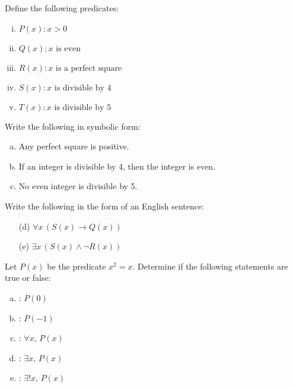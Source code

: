 \documentclass[11pt,letterpaper]{article}
\begin{document}
\newpage





 Define the following predicates:
	\begin{enumerate}[(i)]
	\item $P(x) \colon x > 0$
	\item $Q(x) \colon x \text{ is even}$
	\item $R(x) \colon x \text{ is a perfect square}$
	\item $S(x) \colon x \text{ is divisible by }4$
	\item $T(x) \colon x \text{ is divisible by }5$
	\end{enumerate}
Write the following in symbolic form:
	\begin{enumerate}[(a)]
	\item Any perfect square is positive. 
	\item If an integer is divisible by 4, then the integer is even. 
	\item No even integer is divisible by 5. 
	\end{enumerate}
Write the following in the form of an English sentence:
	\begin{enumerate}
	\item[(d)] $\forall x\, (S(x) \to Q(x))$
	\item[(e)] $\exists x\, (S(x) \wedge \neg R(x))$
	\end{enumerate}





\newpage





 Let $P(x)$ be the predicate $x^2= x$. Determine if the following statements are true or false:
	\begin{enumerate}[(a)]
	\item \uans{1.5cm}: $P(0)$
	\item \uans{1.5cm}: $P(-1)$
	\item \uans{1.5cm}: $\forall x,\, P(x)$
	\item \uans{1.5cm}: $\exists x,\, P(x)$
	\item \uans{1.5cm}: $\exists! x,\, P(x)$
	\end{enumerate}





\newpage
\end{document}
